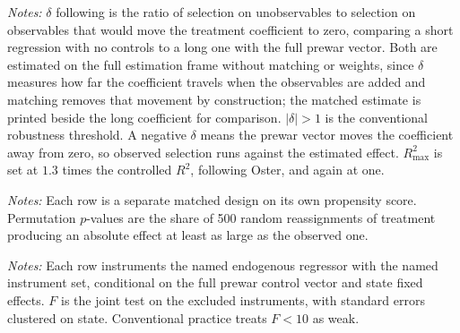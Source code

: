 \documentclass[12pt]{article}
\newcommand{\textcite}[1]{\citet{#1}}
\newcommand{\fittab}[1]{%
  \sbox{\tabbox}{#1}%
  \ifdim\wd\tabbox>\textwidth
    \resizebox{\textwidth}{!}{\usebox{\tabbox}}%
  \else\usebox{\tabbox}\fi}
\begin{document}
\begin{table}[p]
\centering
\caption{Selection on unobservables required to overturn each estimate}
\label{tab:oster}
\fittab{}
\vspace{2pt}
\begin{minipage}{\textwidth}\footnotesize \textit{Notes:} $\delta$ following
\textcite{oster2019} is the ratio of selection on unobservables to selection on
observables that would move the treatment coefficient to zero, comparing a short
regression with no controls to a long one with the full prewar vector. Both are
estimated on the full estimation frame without matching or weights, since
$\delta$ measures how far the coefficient travels when the observables are added
and matching removes that movement by construction; the matched estimate is
printed beside the long coefficient for comparison. $|\delta| > 1$ is the conventional
robustness threshold. A negative $\delta$ means the prewar vector moves the
coefficient away from zero, so observed selection runs against the estimated
effect. $R^2_{\max}$ is set at $1.3$ times the controlled $R^2$, following
Oster, and again at one.\end{minipage}
\end{table}

\begin{table}[p]
\centering
\caption{Placebo tests, military-installation design}
\label{tab:milplacebo}
\fittab{}
\end{table}

\begin{table}[p]
\centering
\caption{Military-installation design: threshold sensitivity and randomization inference}
\label{tab:milrobust}
\fittab{}
\vspace{2pt}
\begin{minipage}{\textwidth}\footnotesize \textit{Notes:} Each row is a separate matched design on its own propensity score. Permutation $p$-values are the share of 500 random reassignments of treatment producing an absolute effect at least as large as the observed one.\end{minipage}
\end{table}

\begin{table}[p]
\centering
\caption{First-stage strength of the 1938 Industrial Mobilization Plan instruments}
\label{tab:firststage}
\fittab{}
\vspace{2pt}
\begin{minipage}{\textwidth}\footnotesize \textit{Notes:} Each row instruments the named endogenous regressor with the named instrument set, conditional on the full prewar control vector and state fixed effects. $F$ is the joint test on the excluded instruments, with standard errors clustered on state. Conventional practice treats $F<10$ as weak.\end{minipage}
\end{table}
\end{document}
